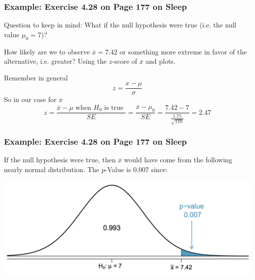 \documentclass[handout]{beamer}
\newcommand{\blue}[1]{\textcolor{blue2}{#1}}
\newcommand{\xbar}{\overline{x}}
\begin{document}
\begin{frame}
\frametitle{Example:  Exercise 4.28 on Page 177 on Sleep}

\blue{Question to keep in mind}:  What if the null hypothesis were true (i.e. the null value $\mu_0=7$)?

\pause \vspace{0.5cm}

How likely are we to observe $\xbar=7.42$ or something more extreme in favor of the alternative, i.e. greater?  Using the $z$-score of $\xbar$ and plots.  

\pause \vspace{0.5cm}

Remember in general
\[
z = \frac{x-\mu}{\sigma}
\]
\pause So in our case for $\xbar$
\[
z = \frac{\xbar - \mu \mbox{ when $H_0$ is true }}{SE} = \frac{\xbar - \mu_0}{SE} = \frac{7.42 - 7}{\frac{1.75}{\sqrt{110}}} = 2.47
\]


\end{frame}



\begin{frame}
\frametitle{Example:  Exercise 4.28 on Page 177 on Sleep}

If the null hypothesis were true, then $\xbar$ would have come from the following nearly normal distribution.  The $p$-Value is 0.007 since:

\begin{center}
\includegraphics[width=\textwidth]{figure/pvalue.png}
\end{center}

\end{frame}
\end{document}
